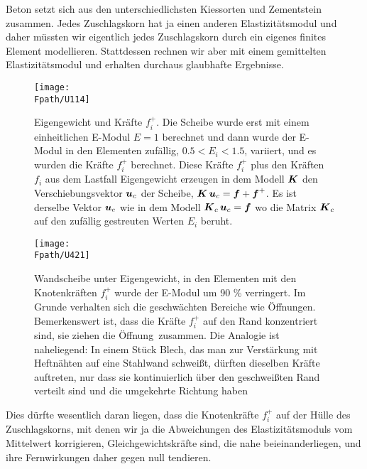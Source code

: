 {{Beton setzt sich aus den unterschiedlichsten Kiessorten und Zementstein zusammen. Jedes Zuschlagskorn hat ja einen anderen Elastizit\"{a}tsmodul und daher m\"{u}ssten wir eigentlich jedes Zuschlagskorn durch ein eigenes finites Element modellieren. Stattdessen rechnen wir aber mit einem gemittelten Elastizit\"{a}tsmodul und erhalten durchaus glaubhafte Ergebnisse.
\begin{figure}[tbp]
\centering
\texttt{[image: \\Fpath/U114]}
\caption{Eigengewicht und Kr\"{a}fte $f_i^+$. Die Scheibe wurde erst mit einem einheitlichen E-Modul $E = 1$ berechnet und dann wurde der E-Modul in den Elementen
zuf\"{a}llig, $0.5 < E_i < 1.5$, variiert, und es wurden die Kr\"{a}fte $f_i^+$ berechnet. Diese Kr\"{a}fte $f_i^+$ plus den Kr\"{a}ften $f_i$ aus dem Lastfall Eigengewicht
erzeugen in dem Modell $\mbox{\boldmath $K$}$ den Verschiebungsvektor $\mbox{\boldmath $u$}_c$ der Scheibe, $\mbox{\boldmath $K$}\,\mbox{\boldmath $u$}_c = \mbox{\boldmath $f$} + \mbox{\boldmath $f$}^+$. Es ist derselbe Vektor $\mbox{\boldmath $u$}_c$ wie in dem
Modell $\mbox{\boldmath $K$}_c\,\mbox{\boldmath $u$}_c = \mbox{\boldmath $f$}$ wo die Matrix $\mbox{\boldmath $K$}_c$ auf den zuf\"{a}llig gestreuten Werten $E_i$ beruht. }
\label{U114}
\end{figure}%

\begin{figure}[tbp]
\centering
\texttt{[image: \\Fpath/U421]}\label{Korrektur27}
\caption{Wandscheibe unter Eigengewicht, in den Elementen mit den Knotenkr\"{a}ften $f_i^+$ wurde der E-Modul um 90 \% verringert. Im Grunde verhalten sich die geschw\"{a}chten Bereiche wie \"{O}ffnungen. Bemerkenswert ist, dass die Kr\"{a}fte $f_i^+$ auf den Rand konzentriert sind, sie ziehen die \glq \"{O}ffnung\grq\ zusammen. Die Analogie ist naheliegend: In einem St\"{u}ck Blech, das man zur Verst\"{a}rkung mit Heftn\"{a}hten auf eine Stahlwand schwei{\ss}t, d\"{u}rften dieselben Kr\"{a}fte auftreten, nur dass sie kontinuierlich \"{u}ber den geschwei{\ss}ten Rand verteilt sind und die umgekehrte Richtung haben   }
\label{U421}
\end{figure}%
Dies d\"{u}rfte wesentlich daran liegen, dass die Knotenkr\"{a}fte $f_i^+$ auf der H\"{u}lle des Zuschlagskorns, mit denen wir ja die Abweichungen des Elastizit\"{a}tsmoduls vom Mittelwert korrigieren, Gleichgewichtskr\"{a}fte sind, die nahe beieinanderliegen, und ihre Fernwirkungen daher gegen null tendieren.

}}
